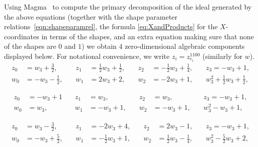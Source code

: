 \documentclass[12pt]{amsart}
\theoremstyle{definition}
\numberwithin{equation}{section}
\begin{document}
Using Magma~\cite{Magma} to compute the primary decomposition of the ideal generated by the above equations (together with the shape parameter relations~\eqref{eqn:shapeparamrel}, the formula \eqref{eq:XandProducts} for the $X$-coordinates in terms of the shapes, and an extra equation making sure that none of the shapes are $0$ and $1$) we obtain $4$ zero-dimensional algebraic components displayed below. For notational convenience, we write $z_i=z_{e_i}^{1100}$ (similarly for $w$).
\begin{equation}
\begin{aligned}
       z_0&=w_3+\frac{3}{2},\quad &z_1&=\frac{1}{2}w_3+\frac{1}{2},\quad &z_2&=-\frac{1}{2}w_3+\frac{1}{4},\quad &z_3= -w_3+1,\\
        w_0&=-w_3-\frac{1}{2},\quad &w_1&=2w_3+2,\quad &w_2&=-2w_3+1,\quad &w_3^2 + \frac{1}{2}w_3 + \frac{1}{2},
\end{aligned}
\end{equation}


\begin{equation}
\begin{aligned}
z_0&=-w_3+1\quad &z_1&=w_3,\quad&z_2&=w_3,\quad&z_3=-w_3+1,\\
w_0&=w_3,\quad&w_1&=-w_3+1,\quad&w_2&=-w_3+1,\quad&w_3^2-w_3+1,
\end{aligned}
\end{equation}


\begin{equation}
\begin{aligned}
z_0&=w_3-\frac{3}{2},\quad&z_1&=-2w_3+4,\quad&z_2&=2w_3-1,\quad&z_3=-w_3+1,\\
w_0&=-w_3+\frac{5}{2},\quad&w_1&=-\frac{1}{2}w_3+1,\quad&w_2&=\frac{1}{2}w_3-\frac{1}{4},\quad&w_3^2-\frac{5}{2}w_3+2,
\end{aligned}
\end{equation}

\end{document}
